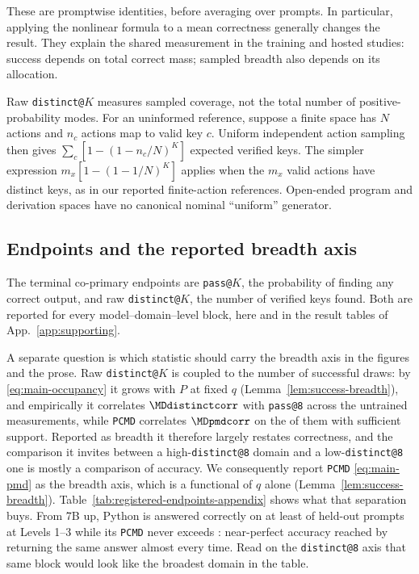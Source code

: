\documentclass{article}
\newcommand{\1}{\mathbf 1}
\newcommand{\pmd}{\texttt{PCMD}}
\theoremstyle{remark}
\theoremstyle{definition}
\theoremstyle{plain}
\begin{document}
These are promptwise identities, before averaging over prompts. In particular,
applying the nonlinear formula to a mean correctness generally changes the
result. They explain the shared measurement in the training and hosted
studies: success depends on total correct mass; sampled breadth also depends
on its allocation.

Raw \texttt{distinct@}$K$ measures sampled coverage, not the total number of
positive-probability modes. For an uninformed reference, suppose a finite
space has $N$ actions and $n_c$ actions map to valid key $c$. Uniform independent
action sampling then gives $\sum_c[1-(1-n_c/N)^K]$ expected verified keys.
The simpler expression $m_x[1-(1-1/N)^K]$ applies when the $m_x$ valid actions
have distinct keys, as in our reported finite-action references.
Open-ended program and derivation spaces have no canonical nominal
``uniform'' generator.

\subsection{Endpoints and the reported breadth axis}
\label{app:registered-endpoints}

The terminal co-primary endpoints are \texttt{pass@}$K$, the probability of
finding any correct output, and raw \texttt{distinct@}$K$, the number of
verified keys found. Both are reported for every model--domain--level block,
here and in the result tables of App.~\ref{app:supporting}.

A separate question is which statistic should carry the breadth axis in the
figures and the prose. Raw \texttt{distinct@}$K$ is coupled to the number of successful
draws: by \eqref{eq:main-occupancy} it grows with $P$ at fixed $q$
(Lemma~\ref{lem:success-breadth}), and
empirically it correlates $\MDdistinctcorr$ with \texttt{pass@8} across the
\MDcells{} untrained measurements, while \pmd{} correlates $\MDpmdcorr$ on the
\MDreportable{} of them with sufficient support.
Reported as breadth it therefore largely restates correctness, and the
comparison it invites between a high-\texttt{distinct@8} domain and a
low-\texttt{distinct@8} one is mostly a comparison of accuracy. We consequently
report \pmd{} \eqref{eq:main-pmd} as the breadth axis, which is a functional of
$q$ alone (Lemma~\ref{lem:success-breadth}).
Table~\ref{tab:registered-endpoints-appendix} shows what that separation buys.
From 7B up, Python is answered correctly on at least \MDpyPasslo{} of held-out
prompts at Levels 1--3 while its \pmd{} never exceeds \MDpyPmdhi{}:
near-perfect accuracy reached by returning the same answer almost every time.
Read on the \texttt{distinct@8} axis that same block would look like the
broadest domain in the table.
\end{document}

